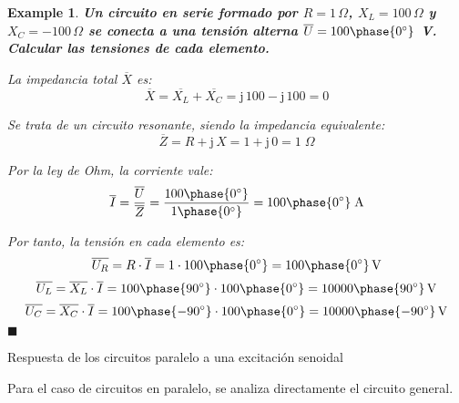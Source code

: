 \documentclass[11pt]{book} %
\makeatletter
\numberwithin{dummy}{section}
\theoremstyle{ocrenumbox}
\theoremstyle{blacknumex}
\newtheorem{exampleT}{Example}[chapter]
\theoremstyle{blacknumbox}
\theoremstyle{ocrenum}
\newenvironment{example}{\begin{exampleT}}{\hfill{\tiny\ensuremath{\blacksquare}}\end{exampleT}}
\renewcommand{\section}{\@startsection{section}{1}{\z@}
{-4ex \@plus -1ex \@minus -.4ex}
{1ex \@plus.2ex }
{\normalfont\large\sffamily\bfseries}}
\newlength\esp
\makeatother
\begin{document}
	\vspace{4mm}
	\begin{example}\label{ej.2-4}
		\textbf{Un circuito en serie formado por $R=1\,\Omega$, ${X_L}=100\,\Omega$ y ${X_C}=-100\,\Omega$ se conecta a una tensión alterna $\overline{U}=100\phase{0^\circ}$ V. Calcular las tensiones de cada elemento.}
		
		La impedancia total $\overline{X}$ es:
		\begin{equation*}
			\overline{X}= \overline{X_L}+\overline{X_C}=\mathrm{j}\,100-\mathrm{j}\,100=0
		\end{equation*}
		
		Se trata de un circuito resonante, siendo la impedancia equivalente:
		\begin{equation*}
			\overline{Z}=R+\mathrm{j}\,X=1+\mathrm{j}\,0=1\;\Omega
		\end{equation*}
		
		Por la ley de Ohm, la corriente vale:
		\begin{equation*}
			\overline{I}=\dfrac{\overline{U}}{\overline{Z}}=\dfrac{100\phase{0^\circ}}{1\phase{0^\circ}}=100\phase{0^\circ}\;\text{A}
		\end{equation*}
		
		Por tanto, la tensión en cada elemento es: 
		\begin{equation*}
			\overline{U_R}=R\cdot\overline{I}=1\cdot 100\phase{0^\circ}=100\phase{0^\circ}\,\text{V}
		\end{equation*}
		\begin{equation*}
			\overline{U_L}=\overline{X_L}\cdot\overline{I}=100\phase{90^\circ}\cdot 100\phase{0^\circ}=10000\phase{90^\circ}\,\text{V}
		\end{equation*}
		\begin{equation*}
			\overline{U_C}=\overline{X_C}\cdot\overline{I}=100\phase{-90^\circ}\cdot 100\phase{0^\circ}=10000\phase{-90^\circ}\,\text{V}
		\end{equation*}
	\end{example}
	
	
	\section{Respuesta de los circuitos paralelo a una excitación senoidal}
	
	Para el caso de circuitos en paralelo, se analiza directamente el circuito general. 
	
\end{document}
